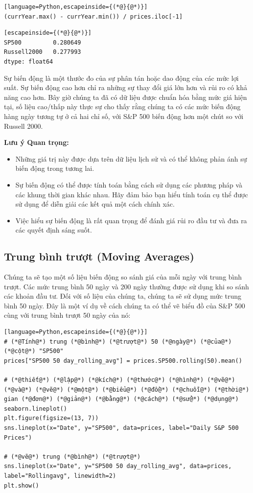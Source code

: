 \begin{lstlisting}[language=Python,escapeinside={(*@}{@*)}]
(currYear.max() - currYear.min()) / prices.iloc[-1]
\end{lstlisting}

\begin{lstlisting}[escapeinside={(*@}{@*)}]
SP500         0.280649
Russell2000   0.277993
dtype: float64
\end{lstlisting}

Sự biến động là một thước đo của sự phân tán hoặc dao động của các mức lợi suất. Sự biến động cao hơn chỉ ra những sự thay đổi giá lớn hơn và rủi ro có khả năng cao hơn. Bây giờ chúng ta đã có dữ liệu được chuẩn hóa bằng mức giá hiện tại, số liệu cao/thấp này thực sự cho thấy rằng chúng ta có các mức biến động hàng ngày tương tự ở cả hai chỉ số, với S\&P 500 biến động hơn một chút so với Russell 2000.

\textbf{Lưu ý Quan trọng:}

\begin{itemize}
  \item Những giá trị này được dựa trên dữ liệu lịch sử và có thể không phản ánh sự biến động trong tương lai.
  \item Sự biến động có thể được tính toán bằng cách sử dụng các phương pháp và các khung thời gian khác nhau. Hãy đảm bảo bạn hiểu tính toán cụ thể được sử dụng để diễn giải các kết quả một cách chính xác.
  \item Việc hiểu sự biến động là rất quan trọng để đánh giá rủi ro đầu tư và đưa ra các quyết định sáng suốt.
\end{itemize}
\subsection{Trung bình trượt (Moving Averages)}

Chúng ta sẽ tạo một số liệu biến động so sánh giá của mỗi ngày với trung bình trượt. Các mức trung bình 50 ngày và 200 ngày thường được sử dụng khi so sánh các khoản đầu tư. Đối với số liệu của chúng ta, chúng ta sẽ sử dụng mức trung bình 50 ngày. Đây là một ví dụ về cách chúng ta có thể vẽ biểu đồ của S\&P 500 cùng với trung bình trượt 50 ngày của nó:

\begin{lstlisting}[language=Python,escapeinside={(*@}{@*)}]
# (*@Tính@*) trung (*@bình@*) (*@trượt@*) 50 (*@ngày@*) (*@của@*) (*@cột@*) "SP500"
prices["SP500 50 day_rolling_avg"] = prices.SP500.rolling(50).mean()

# (*@thiết@*) (*@lập@*) (*@kích@*) (*@thước@*) (*@hình@*) (*@vẽ@*) (*@và@*) (*@vẽ@*) (*@một@*) (*@biểu@*) (*@đồ@*) (*@chuỗi@*) (*@thời@*) gian (*@đơn@*) (*@giản@*) (*@bằng@*) (*@cách@*) (*@sử@*) (*@dụng@*) seaborn.lineplot()
plt.figure(figsize=(13, 7))
sns.lineplot(x="Date", y="SP500", data=prices, label="Daily S&P 500 Prices")

# (*@vẽ@*) trung (*@bình@*) (*@trượt@*)
sns.lineplot(x="Date", y="SP500 50 day_rolling_avg", data=prices, label="Rollingavg", linewidth=2)
plt.show()
\end{lstlisting}


